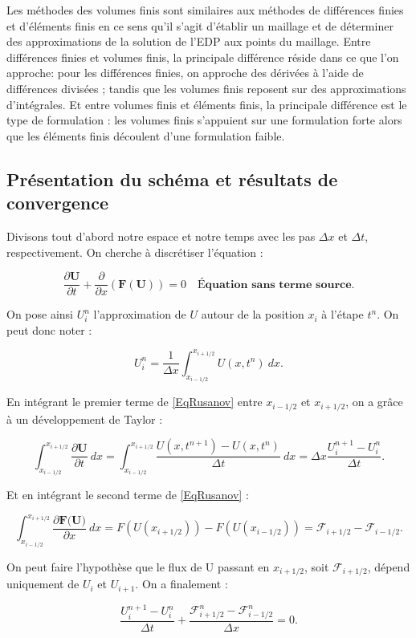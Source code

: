 \documentclass[
11pt, %
francais, %
singlespacing, %
headsepline, %
f%
]{MastersDoctoralThesis} %
\theoremstyle{definition}
\begin{document}
Les méthodes des volumes finis sont similaires aux méthodes de différences finies et d'éléments finis en ce sens qu'il s'agit d'établir un maillage et de déterminer des approximations de la solution de l'EDP aux points du maillage.
Entre différences finies et volumes finis, la principale différence réside dans ce que l'on approche: pour les différences finies, on approche des dérivées à l'aide de différences divisées ; tandis que les volumes finis reposent sur des approximations d'intégrales. Et entre volumes finis et éléments finis, la principale différence est le type de formulation : les volumes finis s'appuient sur une formulation forte alors que les éléments finis découlent d'une formulation faible.

\subsection{Présentation du schéma et résultats de convergence}

Divisons tout d'abord notre espace et notre temps avec les pas $\Delta x$ et $\Delta t$, respectivement. On cherche à discrétiser l'équation : 

$$\frac{\partial\textbf{U}}{\partial t}+\frac{\partial}{\partial x}(\textbf{F} (\textbf{U})) = 0 \quad \textbf{Équation sans terme source} \label{EqRusanov} .$$

On pose ainsi $U_i ^n$ l'approximation de $U$ autour de la position $x_i$ à l'étape $t^n$. On peut donc noter :

$$ U_i ^n = \frac{1}{\Delta x}\int_{x_{i-1/2}}^{x_{i+1/2}} U(x,t^n) \ dx.$$

En intégrant le premier terme de \ref{EqRusanov} entre $x_{i-1/2}$ et $x_{i+1/2}$, on a grâce à un développement de Taylor :

$$ \int_{x_{i-1/2}}^{x_{i+1/2}} \frac{\partial\textbf{U}}{\partial t} \ dx = \int_{x_{i-1/2}}^{x_{i+1/2}} \frac{U(x,t^{n+1}) - U(x,t^{n})}{\Delta t} \ dx = \Delta x \frac{ U_i ^{n+1} - U_i ^{n}}{\Delta t} .$$

Et en intégrant le second terme de \ref{EqRusanov} : 

$$ \int_{x_{i-1/2}}^{x_{i+1/2}} \frac{\partial\textbf{F(U)}}{\partial x} \ dx = F(U(x_{i+1/2})) - F(U(x_{i-1/2} )) = \mathcal{F}_{i+1/2} - \mathcal{F}_{i-1/2}.$$

On peut faire l'hypothèse que le flux de U passant en $x_{i+1/2}$, soit $\mathcal{F}_{i+1/2}$, dépend uniquement de $U_i$ et $U_{i+1}$. On a finalement :

$$ \frac{ U_i ^{n+1} - U_i ^{n}}{\Delta t} + \frac{ \mathcal{F}_{i+1/2} ^n - \mathcal{F}_{i-1/2} ^{n} }{\Delta x} = 0.$$
\end{document}
